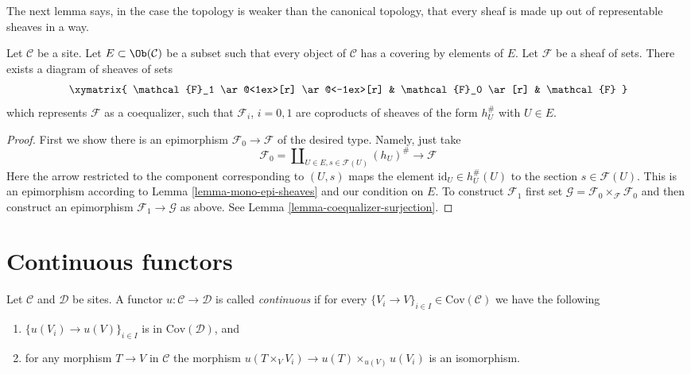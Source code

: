 \noindent
The next lemma says, in the case the topology is weaker than the
canonical topology, that every sheaf is made up out of
representable sheaves in a way.

\begin{lemma}
\label{lemma-sheaf-coequalizer-representable}
Let $\mathcal{C}$ be a site. Let $E \subset \Ob(\mathcal{C})$ be a
subset such that every object of $\mathcal{C}$ has a covering by
elements of $E$. Let $\mathcal{F}$ be a sheaf of sets. There exists a
diagram of sheaves of sets
$$
\xymatrix{
\mathcal{F}_1 \ar@<1ex>[r] \ar@<-1ex>[r] &
\mathcal{F}_0 \ar[r] &
\mathcal{F}
}
$$
which represents $\mathcal{F}$ as a coequalizer,
such that $\mathcal{F}_i$, $i = 0, 1$ are coproducts
of sheaves of the form $h_U^\#$ with $U \in E$.
\end{lemma}

\begin{proof}
First we show there is an epimorphism $\mathcal{F}_0 \to \mathcal{F}$
of the desired type. Namely, just take
$$
\mathcal{F}_0 =
\coprod\nolimits_{U \in E, s \in \mathcal{F}(U)}
(h_U)^\# \longrightarrow \mathcal{F}
$$
Here the arrow restricted to the component corresponding to $(U, s)$ maps
the element $\text{id}_U \in h_U^\#(U)$ to the section $s \in \mathcal{F}(U)$.
This is an epimorphism according to Lemma \ref{lemma-mono-epi-sheaves} and
our condition on $E$. To construct $\mathcal{F}_1$ first set
$\mathcal{G} = \mathcal{F}_0 \times_\mathcal{F} \mathcal{F}_0$ and
then construct an epimorphism $\mathcal{F}_1 \to \mathcal{G}$
as above. See Lemma \ref{lemma-coequalizer-surjection}.
\end{proof}


\section{Continuous functors}
\label{section-continuous-functors}

\begin{definition}
\label{definition-continuous}
Let $\mathcal{C}$ and $\mathcal{D}$ be sites.
A functor $u : \mathcal{C} \to \mathcal{D}$ is called
{\it continuous} if for every
$\{V_i \to V\}_{i\in I} \in \text{Cov}(\mathcal{C})$
we have the following
\begin{enumerate}
\item $\{u(V_i) \to u(V)\}_{i\in I}$ is in $\text{Cov}(\mathcal{D})$, and
\item for any morphism $T \to V$ in $\mathcal{C}$ the morphism
$u(T \times_V V_i) \to u(T) \times_{u(V)} u(V_i)$ is an isomorphism.
\end{enumerate}
\end{definition}

